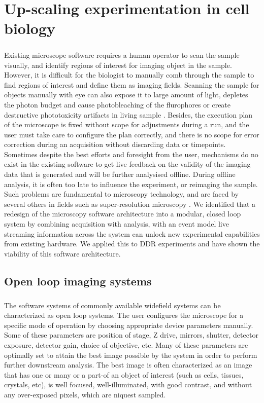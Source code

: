 \chapter{Up-scaling experimentation in cell biology}
\paragraph*{} Existing microscope software requires a human operator to scan the sample visually, and identify regions of interest for imaging object in the sample. However, it is difficult for the biologist to manually comb through the sample to find regions of interest and define them as imaging fields. Scanning the sample for objects manually with eye can also expose it to large amount of light, depletes the photon budget and cause photobleaching of the flurophores or create destructive phototoxicity artifacts in living sample \cite{scherf2015smart}. Besides, the execution plan of the microscope is fixed without scope for adjustments during a run, and the user must take care to configure the plan correctly, and there is no scope for error correction during an acquisition without discarding data or timepoints. Sometimes despite the best efforts and foresight from the user, mechanisms do no exist in the existing software to get live feedback on the validity of the imaging data that is generated and will be further analysised offline. During offline analysis, it is often too late to influence the experiment, or reimaging the sample. Such problems are fundamental to microscopy technology, and are faced by several others in fields such as super-resolution microscopy \cite{D1SC05506B}. We identified that a redesign of the microscopy software architecture into a modular, closed loop system by combining acquisition with analysis, with an event model live streaming information across the system can unlock new experimental capabilities from existing hardware. We applied this to DDR experiments and have shown the viability of this software architecture.


\section{Open loop imaging systems}
\paragraph*{}The software systems of commonly available widefield systems can be characterized as open loop systems. The user configures the microscope for a specific mode of operation by choosing appropriate device parameters manually. Some of these parameters are position of stage, Z drive, mirrors, shutter, detector exposure, detector gain, choice of objective, etc. Many of these parameters are optimally set to attain the best image possible by the system in order to perform further downstream analysis. The best image is often characterized as an image that has one or many or a part-of an object of interest (such as cells, tissues, crystals, etc), is well focused, well-illuminated, with good contrast, and without any over-exposed pixels, which are niquest sampled.


